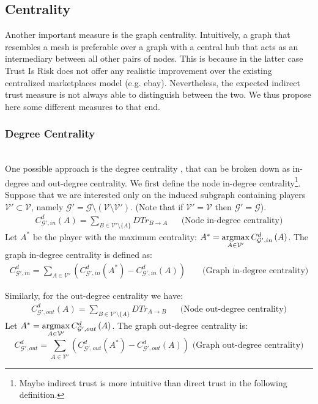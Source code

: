 \subsection{Centrality}
  Another important measure is the graph centrality. Intuitively, a graph that resembles a mesh is preferable over a
  graph with a central hub that acts as an intermediary between all other pairs of nodes. This is because in the latter case
  Trust Is Risk does not offer any realistic improvement over the existing centralized marketplaces model (e.g. ebay).
  Nevertheless, the expected indirect trust measure is not always able to distinguish between the two. We thus propose here
  some different measures to that end.
  
  \subsubsection{Degree Centrality} \ \\

    One possible approach is the degree centrality \cite{freeman}, that can be broken down as in-degree and out-degree
    centrality. We first define the node in-degree centrality\footnote{Maybe indirect trust is more intuitive than direct
    trust in the following definition.}. Suppose that we are interested only on the induced subgraph containing players
    $\mathcal{V}' \subset \mathcal{V}$, namely $\mathcal{G}' = \mathcal{G} \setminus \left(\mathcal{V} \setminus
    \mathcal{V}'\right)$. (Note that if $\mathcal{V}' = \mathcal{V}$ then $\mathcal{G}' = \mathcal{G}$).
    \begin{align*}
      C^d_{\mathcal{G}', in}\left(A\right) = \sum\limits_{B \in \mathcal{V}' \setminus \{A\}}DTr_{B \rightarrow A} && \mbox{
      (Node in-degree centrality)}
    \end{align*}
    Let $A^*$ be the player with the maximum centrality: $A^* = \operatorname*{argmax}\limits_{A \in \mathcal{V}'}C^d_{\mathcal{G}',
    in}\left(A\right)$.  The graph in-degree centrality is defined as:
    \begin{align*}
      C^d_{\mathcal{G}', in} = \sum\limits_{A \in \mathcal{V}'}\left(C^d_{\mathcal{G}', in}\left(A^*\right) -
      C^d_{\mathcal{G}', in}\left(A\right)\right) && \mbox{ (Graph in-degree centrality)}
    \end{align*}
    \addtocounter{footnote}{-1}
    Similarly, for the out-degree centrality we have\footnotemark:
    \begin{align*}
      C^d_{\mathcal{G}', out}\left(A\right) = \sum\limits_{B \in \mathcal{V}' \setminus \{A\}}DTr_{A \rightarrow B} && \mbox{
      (Node out-degree centrality)}
    \end{align*}
    Let $A^* = \operatorname*{argmax}\limits_{A \in \mathcal{V}'}C^d_{\mathcal{G}', out}\left(A\right)$. The graph out-degree centrality is:
    \begin{equation*}
      C^d_{\mathcal{G}', out} = \sum\limits_{A \in \mathcal{V}'}\left(C^d_{\mathcal{G}', out}\left(A^*\right) -
      C^d_{\mathcal{G}', out}\left(A\right)\right) \mbox{ (Graph out-degree centrality)}
    \end{equation*}

